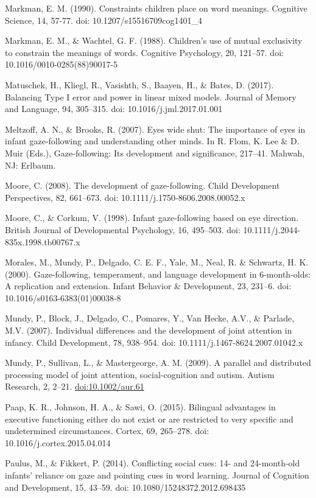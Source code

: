 \documentclass[,man,floatsintext]{apa6}
\begin{document}
Markman, E. M. (1990). Constraints children place on word meanings. Cognitive Science, 14, 57-77. doi: 10.1207/s15516709cog1401\_4

Markman, E. M., \& Wachtel, G. F. (1988). Children's use of mutual exclusivity to constrain the meanings of words. Cognitive Psychology, 20, 121--57. doi: 10.1016/0010-0285(88)90017-5

Matuschek, H., Kliegl, R., Vasishth, S., Baayen, H., \& Bates, D. (2017). Balancing Type I error and power in linear mixed models. Journal of Memory and Language, 94, 305--315. doi: 10.1016/j.jml.2017.01.001

Meltzoff, A. N., \& Brooks, R. (2007). Eyes wide shut: The importance of eyes in infant gaze-following and understanding other minds. In R. Flom, K. Lee \& D. Muir (Eds.), Gaze-following: Its development and significance, 217--41. Mahwah, NJ: Erlbaum.

Moore, C. (2008). The development of gaze-following. Child Development Perspectives, 82, 661--673. doi: 10.1111/j.1750-8606.2008.00052.x

Moore, C., \& Corkum, V. (1998). Infant gaze-following based on eye direction. British Journal of Developmental Psychology, 16, 495--503. doi: 10.1111/j.2044-835x.1998.tb00767.x

Morales, M., Mundy, P., Delgado, C. E. F., Yale, M., Neal, R. \& Schwartz, H. K. (2000). Gaze-following, temperament, and language development in 6-month-olds: A replication and extension. Infant Behavior \& Development, 23, 231--6. doi: 10.1016/s0163-6383(01)00038-8

Mundy, P., Block, J., Delgado, C., Pomares, Y., Van Hecke, A.V., \& Parlade, M.V. (2007). Individual differences and the development of joint attention in infancy. Child Development, 78, 938--954. doi: 10.1111/j.1467-8624.2007.01042.x

Mundy, P., Sullivan, L., \& Mastergeorge, A. M. (2009). A parallel and distributed processing model of joint attention, social-cognition and autism. Autism Research, 2, 2--21. \url{doi:10.1002/aur.61}

Paap, K. R., Johnson, H. A., \& Sawi, O. (2015). Bilingual advantages in executive functioning either do not exist or are restricted to very specific and undetermined circumstances. Cortex, 69, 265--278. doi: 10.1016/j.cortex.2015.04.014

Paulus, M., \& Fikkert, P. (2014). Conflicting social cues: 14- and 24-month-old infants' reliance on gaze and pointing cues in word learning. Journal of Cognition and Development, 15, 43--59. doi: 10.1080/15248372.2012.698435
\end{document}
